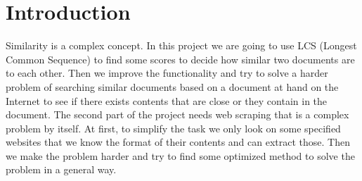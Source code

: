 \section{Introduction}
Similarity is a complex concept. In this project we 
are going to use LCS (Longest Common Sequence) to find 
some scores to decide how similar two documents are to 
each other. Then we improve the functionality and try to 
solve a harder problem of searching similar documents 
based on a document at hand on the Internet to see if 
there exists contents that are close or they contain 
in the document. The second part of the project needs 
web scraping that is a complex problem by itself. At 
first, to simplify the task we only look on some 
specified websites that we know the format of their 
contents and can extract those. Then we make the 
problem harder and try to find some optimized method 
to solve the problem in a general way. 
